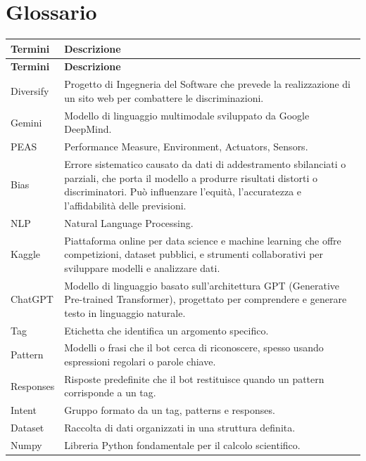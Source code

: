 \documentclass[12pt, letterpaper]{article}
\begin{document}
\newpage
\section{Glossario}
\begin{longtable}{|l|p{10cm}|}
	\hline
	\textbf{Termini} & \textbf{Descrizione} \\
	\hline
	\endfirsthead
	\hline
	\textbf{Termini} & \textbf{Descrizione} \\
	\hline
	\endhead
	\hline
	\endfoot
	\hline
	\endlastfoot
	
	Diversify & Progetto di Ingegneria del Software che prevede la realizzazione di un sito web per combattere le discriminazioni. \\
	\hline
	Gemini & Modello di linguaggio multimodale sviluppato da Google DeepMind. \\
	\hline
	PEAS & Performance Measure, Environment, Actuators, Sensors. \\
	\hline
	Bias & Errore sistematico causato da dati di addestramento sbilanciati o parziali, che porta il modello a produrre risultati distorti o discriminatori. Può influenzare l'equità, l'accuratezza e l'affidabilità delle previsioni. \\
	\hline
	NLP & Natural Language Processing. \\
	\hline
	Kaggle & Piattaforma online per data science e machine learning che offre competizioni, dataset pubblici, e strumenti collaborativi per sviluppare modelli e analizzare dati. \\
	\hline
	ChatGPT & Modello di linguaggio basato sull'architettura GPT (Generative Pre-trained Transformer), progettato per comprendere e generare testo in linguaggio naturale. \\
	\hline
	Tag & Etichetta che identifica un argomento specifico. \\
	\hline
	Pattern & Modelli o frasi che il bot cerca di riconoscere, spesso usando espressioni regolari o parole chiave. \\
	\hline
	Responses & Risposte predefinite che il bot restituisce quando un pattern corrisponde a un tag. \\
	\hline
	Intent & Gruppo formato da un tag, patterns e responses. \\
	\hline
	Dataset & Raccolta di dati organizzati in una struttura definita. \\
	\hline
	Numpy & Libreria Python fondamentale per il calcolo scientifico. \\

\end{longtable}
\end{document}
